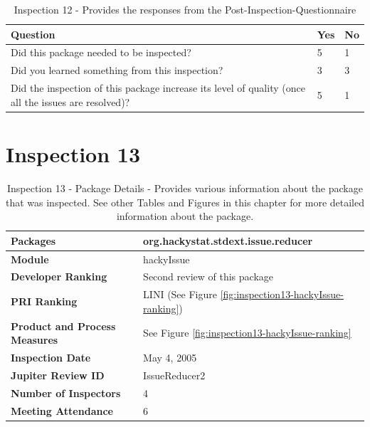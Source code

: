 \begin{table}[!h]
  \begin{center}
    \caption[Post Inspection 12 - Responses]{Inspection 12 - Provides the
      responses from the Post-Inspection-Questionnaire}
    \label{tab:post-inspection-questionnaire-results-12}
    \begin{tabular}{|p{8.0cm}|p{2.5cm}|p{2.5cm}|} \hline
{\bf Question} & {\bf Yes} & {\bf No} \\ \hline
Did this package needed to be inspected?  & 5 & 1 \\ \hline
Did you learned something from this inspection?  & 3 & 3 \\ \hline
Did the inspection of this package increase its level of quality (once all
the issues are resolved)? & 5 & 1 \\ \hline
    \end{tabular}
  \end{center}
\end{table}


\clearpage
\section{Inspection 13}
\label{appendix:section:inspection13}

\begin{table}[!h]
  \begin{center}
    \caption[Inspection 13 - Package Details]{Inspection 13 - Package Details 
      - Provides various information about the package that was
      inspected. See other Tables and Figures in this chapter for more
      detailed information about the package.}
    \label{tab:inspection-package-details-13}
    \begin{tabular}{|p{5.0cm}|p{8.0cm}|} \hline
{\bf Packages} & org.hackystat.stdext.issue.reducer \\ \hline
{\bf Module} & hackyIssue \\ \hline
{\bf Developer Ranking} & Second review of this package \\ \hline
{\bf PRI Ranking} & LINI (See Figure \ref{fig:inspection13-hackyIssue-ranking}) \\ \hline
{\bf Product and Process Measures} & See Figure \ref{fig:inspection13-hackyIssue-ranking} \\ \hline
{\bf Inspection Date} & May 4, 2005 \\ \hline
{\bf Jupiter Review ID} & IssueReducer2 \\ \hline
{\bf Number of Inspectors} & 4 \\ \hline
{\bf Meeting Attendance} & 6 \\ \hline
    \end{tabular}
  \end{center}
\end{table}


